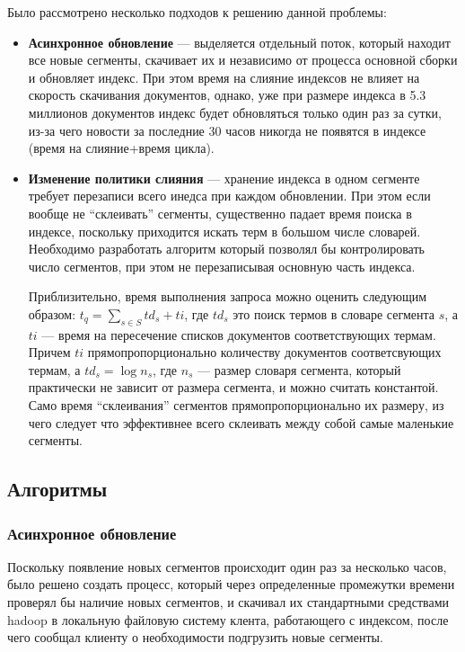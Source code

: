 Было рассмотрено несколько подходов к решению данной проблемы:
\begin{itemize}
 \item \textbf{Асинхронное обновление} --- выделяется отдельный поток, который  находит все новые сегменты, скачивает их и независимо от процесса основной сборки и обновляет индекс. При этом время на слияние индексов не влияет на скорость скачивания документов, однако, уже при размере индекса в 5.3 миллионов документов индекс будет обновляться только один раз за сутки, из-за чего новости за последние 30 часов никогда не появятся в индексе (время на слияние+время цикла).
 \item \textbf{Изменение политики слияния} --- хранение индекса в одном сегменте требует перезаписи всего инедса при каждом обновлении. При этом если вообще не ``склеивать'' сегменты, существенно падает время поиска в индексе, поскольку приходится искать терм в большом числе словарей. Необходимо разработать алгоритм который позволял бы контролировать число сегментов, при этом не перезаписывая основную часть индекса.

Приблизительно, время выполнения запроса можно оценить следующим образом: $t_{q} = \sum\limits_{s\in S} td_{s} + ti$, где $td_{s}$ это поиск термов в словаре сегмента $s$, а $ti$ --- время на пересечение списков документов соответствующих термам. Причем $ti$ прямопропорционально количеству документов соответсвующих термам, а $td_{s} = \log n_{s}$, где $n_{s}$ --- размер словаря сегмента, который практически не зависит от размера сегмента, и можно считать константой. Само время ``склеивания'' сегментов прямопропорционально их размеру, из чего следует что эффективнее всего склеивать между собой самые маленькие сегменты. 
 
\end{itemize}
\subsection{Алгоритмы}
\subsubsection{Асинхронное обновление}
Поскольку появление новых сегментов происходит один раз за несколько часов, было решено создать процесс, который через определенные промежутки времени проверял бы наличие новых сегментов, и скачивал их стандартными средствами hadoop в локальную файловую систему клента, работающего с индексом, после чего сообщал клиенту о необходимости подгрузить новые сегменты.
